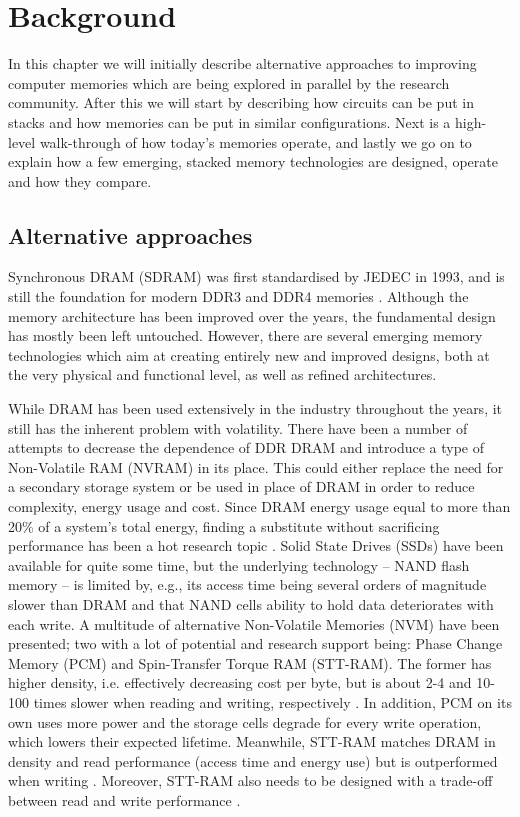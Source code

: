 \chapter{Background} \label{background}
In this chapter we will initially describe alternative approaches to improving computer memories which are being explored in parallel by the research community. After this we will start by describing how circuits can be put in stacks and how memories can be put in similar configurations. Next is a high-level walk-through of how today's memories operate, and lastly we go on to explain how a few emerging, stacked memory technologies are designed, operate and how they compare.
\bigskip

\section{Alternative approaches} \label{NVMRAM}
Synchronous DRAM (SDRAM) was first standardised by JEDEC in 1993, and is still the foundation for modern DDR3 and DDR4 memories \cite{standard2008double}. Although the memory architecture has been improved over the years, the fundamental design has mostly been left untouched. However, there are several emerging memory technologies which aim at creating entirely new and improved designs, both at the very physical and functional level, as well as refined architectures.
\bigskip

While DRAM has been used extensively in the industry throughout the years, it still has the inherent problem with volatility. There have been a number of attempts to decrease the dependence of DDR DRAM and introduce a type of Non-Volatile RAM (NVRAM) in its place. This could either replace the need for a secondary storage system or be used in place of DRAM in order to reduce complexity, energy usage and cost. Since DRAM energy usage equal to more than 20\% of a system's total energy, finding a substitute without sacrificing performance has been a hot research topic \cite{4658649}. Solid State Drives (SSDs) have been available for quite some time, but the underlying technology -- NAND flash memory -- is limited by, e.g., its access time being several orders of magnitude slower than DRAM and that NAND cells ability to hold data deteriorates with each write. A multitude of alternative Non-Volatile Memories (NVM) have been presented; two with a lot of potential and research support being: Phase Change Memory (PCM) and Spin-Transfer Torque RAM (STT-RAM). The former has higher density, i.e. effectively decreasing cost per byte, but is about 2-4 and 10-100 times slower when reading and writing, respectively \cite{Qureshi:2009:SHP:1555754.1555760, 5388621}. In addition, PCM on its own uses more power and the storage cells degrade for every write operation, which lowers their expected lifetime.  Meanwhile, STT-RAM matches DRAM in density and read performance (access time and energy use) but is outperformed when writing \cite{6557176, 6027811}. Moreover, STT-RAM also needs to be designed with a trade-off between read and write performance \cite{Wang_2013, Khvalkovskiy_2013}.
\bigskip

